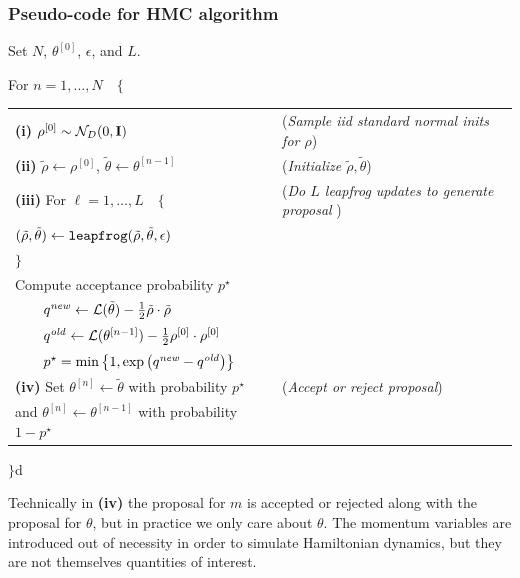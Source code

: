 \subsubsection{Pseudo-code for HMC algorithm}


\noindent Set $N$, $\theta^{[0]}$, $\epsilon$, and $L$.

\noindent For $n = 1, \dots, N \quad \{$ 

\begin{tabular}{ll}
{\bf (i)} $\rho^{[0]} \sim \mathcal{N}_D(0, \mathbf{I})$ & ({\it Sample iid standard normal inits for $\rho$}) \\

{\bf (ii)} $\tilde{\rho} \leftarrow \rho^{[0]}$, $\tilde{\theta} \leftarrow \theta^{[n-1]}$ &  ({\it Initialize $\tilde{\rho}, \tilde{\theta}$})\\

{\bf (iii)} For $\ell = 1, \dots, L \quad \{$  & ({\it Do $L$ leapfrog updates to generate proposal }) \\[-8pt]

\qquad $(\tilde{\rho}, \tilde{\theta}) \leftarrow {\tt leapfrog}(\tilde{\rho}, \tilde{\theta}, \epsilon)$ & \\[-8pt]
\quad $\}$ & \\

\quad Compute acceptance probability $p^\star$  & \\[-8pt]
$\qquad  q^{\it new} \leftarrow  \mathcal{L}(\tilde{\theta}) - \tfrac{1}{2} \tilde{\rho} \cdot \tilde{\rho} $ & \\[-8pt]
$ \qquad q^{\it old} \leftarrow   \mathcal{L}(\theta^{[n-1]} ) -  \tfrac{1}{2} \rho^{[0]} \cdot \rho^{[0]} $ & \\[-8pt]
$ \qquad p^\star = \min{\left\{1, \exp{\left( q^{\it new} - q^{\it old} \right)} \right\}} $& \\[3pt]

{\bf (iv)} Set $\theta^{[n]} \leftarrow \tilde{\theta}$ with probability $p^\star$  & ({\it Accept or reject proposal})\\
\qquad and $\theta^{[n]} \leftarrow \theta^{[n-1]}$ with probability $ 1 - p^\star$ & \\

\end{tabular}

\noindent $\}$d

Technically in {\bf (iv)} the proposal for $m$ is accepted or rejected along with the proposal for 
$\theta$, but in practice we only care about $\theta$. The momentum variables are introduced out of necessity 
in order to simulate Hamiltonian dynamics, but they are not themselves quantities of interest.

